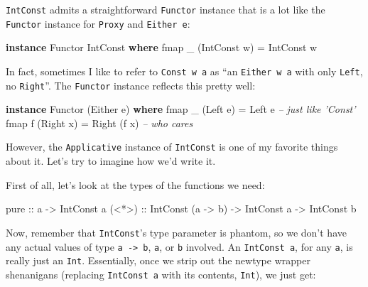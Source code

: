 \documentclass[]{article}
\newenvironment{Shaded}{}{}
\newcommand{\CommentTok}[1]{\textcolor[rgb]{0.38,0.63,0.69}{\textit{#1}}}
\newcommand{\DataTypeTok}[1]{\textcolor[rgb]{0.56,0.13,0.00}{#1}}
\newcommand{\FunctionTok}[1]{\textcolor[rgb]{0.02,0.16,0.49}{#1}}
\newcommand{\KeywordTok}[1]{\textcolor[rgb]{0.00,0.44,0.13}{\textbf{#1}}}
\newcommand{\NormalTok}[1]{#1}
\newcommand{\OtherTok}[1]{\textcolor[rgb]{0.00,0.44,0.13}{#1}}
\begin{document}
\texttt{IntConst} admits a straightforward \texttt{Functor} instance that is a
lot like the \texttt{Functor} instance for \texttt{Proxy} and
\texttt{Either\ e}:

\begin{Shaded}
\begin{Highlighting}[]
\KeywordTok{instance} \DataTypeTok{Functor} \DataTypeTok{IntConst} \KeywordTok{where}
\NormalTok{    fmap _ (}\DataTypeTok{IntConst}\NormalTok{ w) }\FunctionTok{=} \DataTypeTok{IntConst}\NormalTok{ w}
\end{Highlighting}
\end{Shaded}

In fact, sometimes I like to refer to \texttt{Const\ w\ a} as ``an
\texttt{Either\ w\ a} with only \texttt{Left}, no \texttt{Right}''. The
\texttt{Functor} instance reflects this pretty well:

\begin{Shaded}
\begin{Highlighting}[]
\KeywordTok{instance} \DataTypeTok{Functor}\NormalTok{ (}\DataTypeTok{Either}\NormalTok{ e) }\KeywordTok{where}
\NormalTok{    fmap _ (}\DataTypeTok{Left}\NormalTok{ e)  }\FunctionTok{=} \DataTypeTok{Left}\NormalTok{ e        }\CommentTok{-- just like 'Const'}
\NormalTok{    fmap f (}\DataTypeTok{Right}\NormalTok{ x) }\FunctionTok{=} \DataTypeTok{Right}\NormalTok{ (f x)   }\CommentTok{-- who cares}
\end{Highlighting}
\end{Shaded}

However, the \texttt{Applicative} instance of \texttt{IntConst} is one of my
favorite things about it. Let's try to imagine how we'd write it.

First of all, let's look at the types of the functions we need:

\begin{Shaded}
\begin{Highlighting}[]
\NormalTok{pure}\OtherTok{  ::}\NormalTok{ a }\OtherTok{->} \DataTypeTok{IntConst}\NormalTok{ a}
\OtherTok{(<*>) ::} \DataTypeTok{IntConst}\NormalTok{ (a }\OtherTok{->}\NormalTok{ b) }\OtherTok{->} \DataTypeTok{IntConst}\NormalTok{ a }\OtherTok{->} \DataTypeTok{IntConst}\NormalTok{ b}
\end{Highlighting}
\end{Shaded}

Now, remember that \texttt{IntConst}'s type parameter is phantom, so we don't
have any actual values of type \texttt{a\ -\textgreater{}\ b}, \texttt{a}, or
\texttt{b} involved. An \texttt{IntConst\ a}, for any \texttt{a}, is really just
an \texttt{Int}. Essentially, once we strip out the newtype wrapper shenanigans
(replacing \texttt{IntConst\ a} with its contents, \texttt{Int}), we just get:
\end{document}
